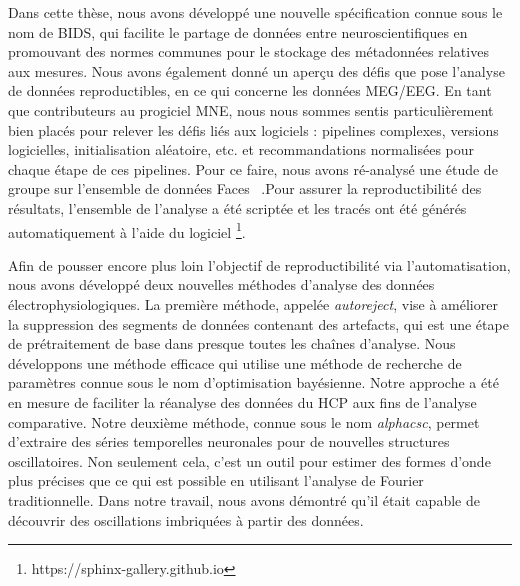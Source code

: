 Dans cette thèse, nous avons développé une nouvelle spécification connue sous le nom de BIDS, qui facilite le partage de données entre neuroscientifiques en promouvant des normes communes pour le stockage des métadonnées relatives aux mesures. Nous avons également donné un aperçu des défis que pose l'analyse de données reproductibles, en ce qui concerne les données MEG/EEG. En tant que contributeurs au progiciel MNE, nous nous sommes sentis particulièrement bien placés pour relever les défis liés aux logiciels : pipelines complexes, versions logicielles, initialisation aléatoire, etc. et recommandations normalisées pour chaque étape de ces pipelines. Pour ce faire, nous avons ré-analysé une étude de groupe sur l'ensemble de données Faces ~\citep{wakeman2015multi}.Pour assurer la reproductibilité des résultats, l'ensemble de l'analyse a été scriptée et les tracés ont été générés automatiquement à l'aide du logiciel \footnote{https://sphinx-gallery.github.io}.

Afin de pousser encore plus loin l'objectif de reproductibilité via l'automatisation, nous avons développé deux nouvelles méthodes d'analyse des données électrophysiologiques. La première méthode, appelée \emph{autoreject}, vise à améliorer la suppression des segments de données contenant des artefacts, qui est une étape de prétraitement de base dans presque toutes les chaînes d'analyse. Nous développons une méthode efficace qui utilise une méthode de recherche de paramètres connue sous le nom d'optimisation bayésienne. Notre approche a été en mesure de faciliter la réanalyse des données du \ac{HCP} aux fins de l'analyse comparative. Notre deuxième méthode, connue sous le nom \emph{alphacsc}, permet d'extraire des séries temporelles neuronales pour de nouvelles structures oscillatoires. Non seulement cela, c'est un outil pour estimer des formes d'onde plus précises que ce qui est possible en utilisant l'analyse de Fourier traditionnelle. Dans notre travail, nous avons démontré qu'il était capable de découvrir des oscillations imbriquées à partir des données.

